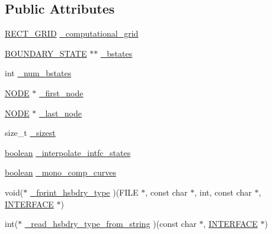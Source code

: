 \subsection*{Public Attributes}
\begin{DoxyCompactItemize}
\item 
\hyperlink{geom_8h_a983fdb6b46c9b99969bffa62eae7d31d}{R\+E\+C\+T\+\_\+\+G\+R\+ID} \hyperlink{struct___f___u_s_e_r___i_n_t_e_r_f_a_c_e_a64bf63c107e02119cfea43441fc53e97}{\+\_\+computational\+\_\+grid}
\item 
\hyperlink{fuserint_8h_aa5ea6c6133c78283abb443509e406d6a}{B\+O\+U\+N\+D\+A\+R\+Y\+\_\+\+S\+T\+A\+TE} $\ast$$\ast$ \hyperlink{struct___f___u_s_e_r___i_n_t_e_r_f_a_c_e_a9e382a5b4a746e25c04f1ad09651cda2}{\+\_\+bstates}
\item 
int \hyperlink{struct___f___u_s_e_r___i_n_t_e_r_f_a_c_e_af038c256b002f6bae5cfd6957cdf3072}{\+\_\+num\+\_\+bstates}
\item 
\hyperlink{int_8h_a65acc517559b106aa8e5fe339247ddcd}{N\+O\+DE} $\ast$ \hyperlink{struct___f___u_s_e_r___i_n_t_e_r_f_a_c_e_aed2f1d2b69d86198553939b70473d1c1}{\+\_\+first\+\_\+node}
\item 
\hyperlink{int_8h_a65acc517559b106aa8e5fe339247ddcd}{N\+O\+DE} $\ast$ \hyperlink{struct___f___u_s_e_r___i_n_t_e_r_f_a_c_e_af2e77268e4b734f0d5266e94f9b43f6c}{\+\_\+last\+\_\+node}
\item 
size\+\_\+t \hyperlink{struct___f___u_s_e_r___i_n_t_e_r_f_a_c_e_a435ff8baf1e2d65e36db40cf38d83a03}{\+\_\+sizest}
\item 
\hyperlink{cdecs_8h_ad048433382a936258fb49e2ec4f148e1}{boolean} \hyperlink{struct___f___u_s_e_r___i_n_t_e_r_f_a_c_e_a8ab0fbee2993bbe8d1b7f4b50f09e4fe}{\+\_\+interpolate\+\_\+intfc\+\_\+states}
\item 
\hyperlink{cdecs_8h_ad048433382a936258fb49e2ec4f148e1}{boolean} \hyperlink{struct___f___u_s_e_r___i_n_t_e_r_f_a_c_e_ab5ea528473b7a6d9edf7aa7de5acd809}{\+\_\+mono\+\_\+comp\+\_\+curves}
\item 
void($\ast$ \hyperlink{struct___f___u_s_e_r___i_n_t_e_r_f_a_c_e_a5c304c3a519f0490fd9096b96b6d44a6}{\+\_\+fprint\+\_\+hsbdry\+\_\+type} )(F\+I\+LE $\ast$, const char $\ast$, int, const char $\ast$, \hyperlink{int_8h_a58cf562d0d320a608294b7310ea167dc}{I\+N\+T\+E\+R\+F\+A\+CE} $\ast$)
\item 
int($\ast$ \hyperlink{struct___f___u_s_e_r___i_n_t_e_r_f_a_c_e_ad9ce599fbb6c3dfa5dce695c30d324be}{\+\_\+read\+\_\+hsbdry\+\_\+type\+\_\+from\+\_\+string} )(const char $\ast$, \hyperlink{int_8h_a58cf562d0d320a608294b7310ea167dc}{I\+N\+T\+E\+R\+F\+A\+CE} $\ast$)
$$
\end{DoxyCompactItemize}
